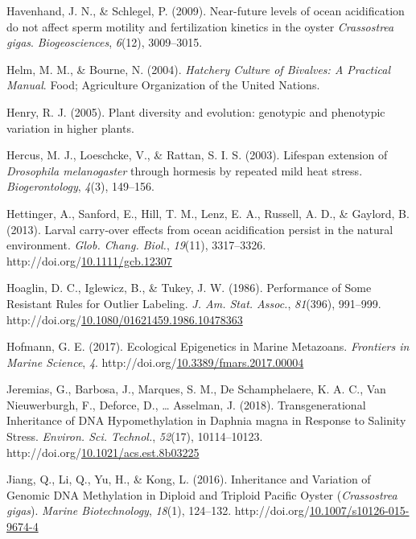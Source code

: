 \documentclass [11pt, proquest] {uwthesis}[2015/03/03]
\newlength{\cslhangindent}
\newenvironment{CSLReferences}%
{\setlength{\parindent}{0pt}%
\everypar{\setlength{\hangindent}{\cslhangindent}}\ignorespaces}%
{\par}
\begin{document}
\begin{CSLReferences}{1}{0}
\leavevmode\hypertarget{ref-Havenhand2009}{}%
Havenhand, J. N., \& Schlegel, P. (2009). {Near-future levels of ocean acidification do not affect sperm motility and fertilization kinetics in the oyster \emph{Crassostrea gigas}}. \emph{Biogeosciences}, \emph{6}(12), 3009--3015.

\leavevmode\hypertarget{ref-Helm2004}{}%
Helm, M. M., \& Bourne, N. (2004). \emph{{Hatchery Culture of Bivalves: A Practical Manual}}. Food; Agriculture Organization of the United Nations.

\leavevmode\hypertarget{ref-Henry2005}{}%
Henry, R. J. (2005). {Plant diversity and evolution: genotypic and phenotypic variation in higher plants}.

\leavevmode\hypertarget{ref-Hercus2003}{}%
Hercus, M. J., Loeschcke, V., \& Rattan, S. I. S. (2003). {Lifespan extension of \emph{Drosophila melanogaster} through hormesis by repeated mild heat stress}. \emph{Biogerontology}, \emph{4}(3), 149--156.

\leavevmode\hypertarget{ref-Hettinger2013}{}%
Hettinger, A., Sanford, E., Hill, T. M., Lenz, E. A., Russell, A. D., \& Gaylord, B. (2013). {Larval carry-over effects from ocean acidification persist in the natural environment}. \emph{Glob. Chang. Biol.}, \emph{19}(11), 3317--3326. http://doi.org/\href{https://doi.org/10.1111/gcb.12307}{10.1111/gcb.12307}

\leavevmode\hypertarget{ref-Hoaglin1986}{}%
Hoaglin, D. C., Iglewicz, B., \& Tukey, J. W. (1986). {Performance of Some Resistant Rules for Outlier Labeling}. \emph{J. Am. Stat. Assoc.}, \emph{81}(396), 991--999. http://doi.org/\href{https://doi.org/10.1080/01621459.1986.10478363}{10.1080/01621459.1986.10478363}

\leavevmode\hypertarget{ref-Hofmann2017}{}%
Hofmann, G. E. (2017). {Ecological Epigenetics in Marine Metazoans}. \emph{Frontiers in Marine Science}, \emph{4}. http://doi.org/\href{https://doi.org/10.3389/fmars.2017.00004}{10.3389/fmars.2017.00004}

\leavevmode\hypertarget{ref-Jeremias2018}{}%
Jeremias, G., Barbosa, J., Marques, S. M., De Schamphelaere, K. A. C., Van Nieuwerburgh, F., Deforce, D., \ldots{} Asselman, J. (2018). {Transgenerational Inheritance of DNA Hypomethylation in Daphnia magna in Response to Salinity Stress}. \emph{Environ. Sci. Technol.}, \emph{52}(17), 10114--10123. http://doi.org/\href{https://doi.org/10.1021/acs.est.8b03225}{10.1021/acs.est.8b03225}

\leavevmode\hypertarget{ref-Jiang2016}{}%
Jiang, Q., Li, Q., Yu, H., \& Kong, L. (2016). {Inheritance and Variation of Genomic DNA Methylation in Diploid and Triploid Pacific Oyster (\emph{Crassostrea gigas})}. \emph{Marine Biotechnology}, \emph{18}(1), 124--132. http://doi.org/\href{https://doi.org/10.1007/s10126-015-9674-4}{10.1007/s10126-015-9674-4}


\end{CSLReferences}
\end{document}
